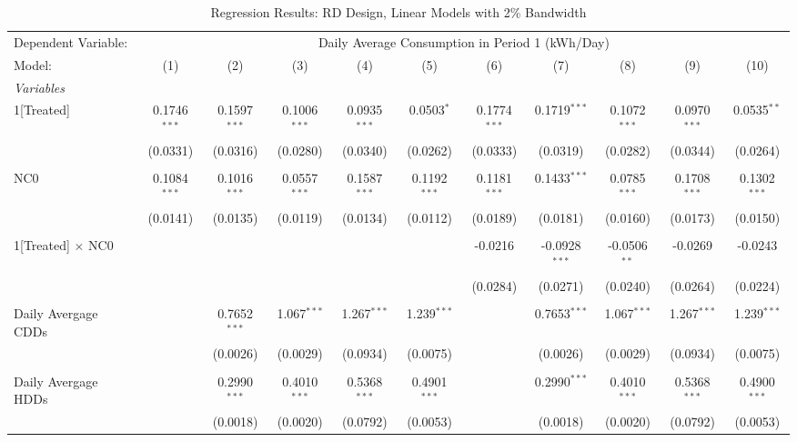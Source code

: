\begin{table}[htbp]
\centering
\caption{\label{Table:Regression-Results_RD_Linear_BW-2} Regression Results: RD Design, Linear Models with 2\% Bandwidth}
\begin{adjustbox}{scale = 0.75}
\begin{tabular}{lcccccccccc}
\tabularnewline\toprule\toprule
Dependent Variable:&\multicolumn{10}{c}{Daily Average Consumption in Period 1 (kWh/Day)}\\
Model:&(1) & (2) & (3) & (4) & (5) & (6) & (7) & (8) & (9) & (10)\\
\midrule
\emph{Variables}&   &   &   &   &   &   &   &   &   &  \\
1[Treated]&0.1746$^{***}$ & 0.1597$^{***}$ & 0.1006$^{***}$ & 0.0935$^{***}$ & 0.0503$^{*}$ & 0.1774$^{***}$ & 0.1719$^{***}$ & 0.1072$^{***}$ & 0.0970$^{***}$ & 0.0535$^{**}$\\
  &(0.0331) & (0.0316) & (0.0280) & (0.0340) & (0.0262) & (0.0333) & (0.0319) & (0.0282) & (0.0344) & (0.0264)\\
& & & & & & & & & & \\
NC0&0.1084$^{***}$ & 0.1016$^{***}$ & 0.0557$^{***}$ & 0.1587$^{***}$ & 0.1192$^{***}$ & 0.1181$^{***}$ & 0.1433$^{***}$ & 0.0785$^{***}$ & 0.1708$^{***}$ & 0.1302$^{***}$\\
  &(0.0141) & (0.0135) & (0.0119) & (0.0134) & (0.0112) & (0.0189) & (0.0181) & (0.0160) & (0.0173) & (0.0150)\\
& & & & & & & & & & \\
1[Treated] $\times $ NC0&   &    &    &    &    & -0.0216 & -0.0928$^{***}$ & -0.0506$^{**}$ & -0.0269 & -0.0243\\
  &   &    &    &    &    & (0.0284) & (0.0271) & (0.0240) & (0.0264) & (0.0224)\\
& & & & & & & & & & \\
Daily Avergage CDDs&   & 0.7652$^{***}$ & 1.067$^{***}$ & 1.267$^{***}$ & 1.239$^{***}$ &    & 0.7653$^{***}$ & 1.067$^{***}$ & 1.267$^{***}$ & 1.239$^{***}$\\
  &   & (0.0026) & (0.0029) & (0.0934) & (0.0075) &    & (0.0026) & (0.0029) & (0.0934) & (0.0075)\\
& & & & & & & & & & \\
Daily Avergage HDDs&   & 0.2990$^{***}$ & 0.4010$^{***}$ & 0.5368$^{***}$ & 0.4901$^{***}$ &    & 0.2990$^{***}$ & 0.4010$^{***}$ & 0.5368$^{***}$ & 0.4900$^{***}$\\
  &   & (0.0018) & (0.0020) & (0.0792) & (0.0053) &    & (0.0018) & (0.0020) & (0.0792) & (0.0053)\\

\end{tabular}
\end{adjustbox}
\end{table}
